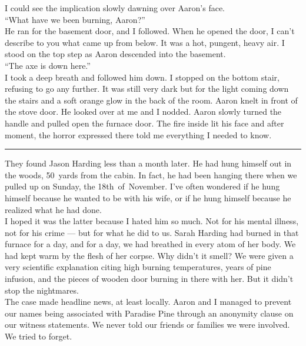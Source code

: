 \documentclass[a5paper]{scrartcl}
\begin{document}
I could see the implication slowly dawning over Aaron's face.\\


\enquote{What have we been burning, Aaron?}\\


He ran for the basement door, and I followed. When he opened the door, I can't describe to you what came up from below. It was a hot, pungent, heavy air. I stood on the top step as Aaron descended into the basement.\\


\enquote{The axe is down here.}\\


I took a deep breath and followed him down. I stopped on the bottom stair, refusing to go any further. It was still very dark but for the light coming down the stairs and a soft orange glow in the back of the room. Aaron knelt in front of the stove door. He looked over at me and I nodded. Aaron slowly turned the handle and pulled open the furnace door. The fire inside lit his face and after moment, the horror expressed there told me everything I needed to know.\\

\hrule

They found Jason Harding less than a month later. He had hung himself out in the woods, 50~yards from the cabin. In fact, he had been hanging there when we pulled up on Sunday, the 18th~of~November. I've often wondered if he hung himself because he wanted to be with his wife, or if he hung himself because he realized what he had done.\\


I hoped it was the latter because I hated him so much. Not for his mental illness, not for his crime --- but for what he did to us. Sarah Harding had burned in that furnace for a day, and for a day, we had breathed in every atom of her body. We had kept warm by the flesh of her corpse. Why didn't it smell? We were given a very scientific explanation citing high burning temperatures, years of pine infusion, and the pieces of wooden door burning in there with her. But it didn't stop the nightmares.\\


The case made headline news, at least locally. Aaron and I managed to prevent our names being associated with Paradise Pine through an anonymity clause on our witness statements.  We never told our friends or families we were involved. We tried to forget. \\
\end{document}
